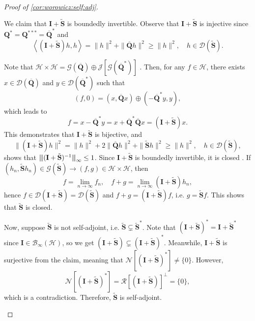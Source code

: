 \documentclass[noinfoline]{imsart}\setcounter{tocdepth}{2}
\newcommand{\m}[1]{\mathbf{#1}} %
\renewcommand{\c}[1]{\mathcal{#1}} %
\newcommand{\innpr}[2]{{\left\langle {#1},{#2}\right\rangle}} %
\newcommand{\vertii}[1]{{\vert\kern-0.25ex\vert\kern-0.25ex\vert #1 
    \vert\kern-0.25ex\vert\kern-0.25ex\vert}} %
\theoremstyle{plain}
\begin{document}
\begin{proof}[Proof of \cref{cor:worowicz:self:adj}]
\begin{enumerate}[leftmargin = *]
We claim that $\m{I} + \tilde{\m{S}}$ is boundedly invertible.
Observe that $\m{I} + \tilde{\m{S}}$ is injective since $\m{Q}^{*} = \m{Q}^{***} = \overline{\m{Q}}^{*}$ and
\begin{equation*}
    \innpr{(\m{I} + \tilde{\m{S}})h}{h} = \|h\|^{2} + \| \overline{\m{Q}} h\|^{2} \ge \|h\|^{2}, \quad h \in \c{D}(\tilde{\m{S}}).
\end{equation*}

Note that $\c{H} \times \c{H} = \c{G}(\overline{\m{Q}}) \oplus \c{J} [\c{G}(\overline{\m{Q}}^{*})]$ \cite{conway2019course}. Then, for any $f \in \c{H}$, there exists $x \in \c{D}(\overline{\m{Q}})$ and $y \in \c{D}(\overline{\m{Q}}^{*})$ such that
\begin{equation*}
    (f, 0) = (x, \overline{\m{Q}}x) \oplus (-\overline{\m{Q}}^{*}y, y),
\end{equation*}
which leads to
\begin{equation*}
    f = x - \overline{\m{Q}}^{*}y = x + \overline{\m{Q}}^{*} \overline{\m{Q}} x = (\m{I} + \tilde{\m{S}})x.
\end{equation*}
This demonstrates that $\m{I} + \tilde{\m{S}}$ is bijective, and 
\begin{equation*}
    \|(\m{I} + \tilde{\m{S}})h\|^{2} = \|h\|^{2} + 2 \| \overline{\m{Q}} h\|^{2} + \|\tilde{\m{S}} h\|^{2} \ge \|h\|^{2}, \quad h \in \c{D}(\tilde{\m{S}}),
\end{equation*}
shows that $\vertii{(\m{I} + \tilde{\m{S}})^{-1}}_{\infty} \le 1$. 
Since $\m{I} + \tilde{\m{S}}$ is boundedly invertible, it is closed \cite{conway2019course}. If $(h_{n}, \tilde{\m{S}} h_{n}) \in \c{G}(\tilde{\m{S}}) \to (f, g) \in \c{H} \times \c{H}$, then
\begin{equation*}
    f = \lim_{n \to \infty} f_{n}, \quad f + g = \lim_{n \to \infty} (\m{I} + \tilde{\m{S}}) h_{n},
\end{equation*}
hence $f \in \c{D}(\m{I} + \tilde{\m{S}}) = \c{D}(\tilde{\m{S}})$ and $f + g = (\m{I} + \tilde{\m{S}}) f$, i.e. $g = \tilde{\m{S}} f$. This shows that $\tilde{\m{S}}$ is closed.

Now, suppose $\tilde{\m{S}}$ is not self-adjoint, i.e. $\tilde{\m{S}} \subsetneq \tilde{\m{S}}^{*}$. Note that $(\m{I}+\tilde{\m{S}})^{*} = \m{I}+\tilde{\m{S}}^{*}$ since $\m{I} \in \c{B}_{\infty}(\c{H})$, so we get $(\m{I}+\tilde{\m{S}}) \subsetneq (\m{I}+\tilde{\m{S}})^{*}$. Meanwhile, $\m{I} + \tilde{\m{S}}$ is surjective from the claim, meaning that $\c{N}[(\m{I}+\tilde{\m{S}})^{*}] \neq \{0\}$. However,
\begin{equation*}
    \c{N}[(\m{I}+\tilde{\m{S}})^{*}] = \c{R}[(\m{I}+\tilde{\m{S}})]^{\perp} = \{0\},
\end{equation*}
which is a contradiction. Therefore, $\tilde{\m{S}}$ is self-adjoint.
\end{enumerate}
\end{proof}
\end{document}
